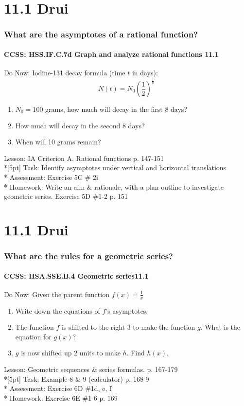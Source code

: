 \documentclass{beamer}
\begin{document}
  \section{11.1 Drui}
  \frame
  {
    \frametitle{What are the asymptotes of a rational function?}
    \framesubtitle{CCSS: HSS.IF.C.7d Graph and analyze rational functions \qquad \alert{11.1}}

    \begin{block}{Do Now: Iodine-131 decay formula (time $t$ in days): \[N(t)=N_0 \left( \frac{1}{2} \right)^{\frac{t}{8}}\]}
    \begin{enumerate}
        \item $N_0=100$ grams, how much will decay in the first 8 days?
        \item How much will decay in the second 8 days?
        \item When will 10 grams remain?
    \end{enumerate}
    \end{block}
    Lesson: IA Criterion A. Rational functions p. 147-151\\*[5pt]
    Task: Identify asymptotes under vertical and horizontal translations\\*
    Assessment: Exercise 5C \# 2i\\*
    Homework: Write an aim \& rationale, with a plan outline to investigate geometric series. Exercise 5D \#1-2 p. 151
  }


  \section{11.1 Drui}
  \frame
  {
    \frametitle{What are the rules for a geometric series?}
    \framesubtitle{CCSS: HSA.SSE.B.4 Geometric series\qquad \alert{11.1}}

    \begin{block}{Do Now: Given the parent function $f(x)=\frac{1}{x}$}
    \begin{enumerate}
        \item Write down the equations of $f$'s asymptotes.
        \item The function $f$ is shifted to the right 3 to make the function $g$. What is the equation for $g(x)$?
        \item $g$ is now shifted up 2 units to make $h$. Find $h(x)$.
    \end{enumerate}
    \end{block}
    Lesson: Geometric sequences \& series formulas. p. 167-179\\*[5pt]
    Task: Example 8 \& 9 (calculator) p. 168-9\\*
    Assessment: Exercise 6D \#1d, e, f\\*
    Homework: Exercise 6E \#1-6 p. 169
  }
\end{document}
